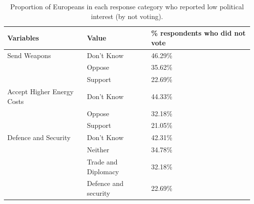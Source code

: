 \begin{table}

\caption{Proportion of Europeans in each response category who reported low political interest (by not voting).\label{tab:dont_know}}
\centering
\begin{tabular}[t]{lll}
\toprule
Variables & Value & \% respondents who did not vote\\
\midrule
Send Weapons & Don't Know & 46.29\%\\
 & Oppose & 35.62\%\\
 & Support & 22.69\%\\
Accept Higher Energy Costs & Don't Know & 44.33\%\\
 & Oppose & 32.18\%\\
 & Support & 21.05\%\\
Defence and Security & Don't Know & 42.31\%\\
 & Neither & 34.78\%\\
 & Trade and Diplomacy & 32.18\%\\
 & Defence and security & 22.69\%\\
\bottomrule
\end{tabular}
\end{table}
